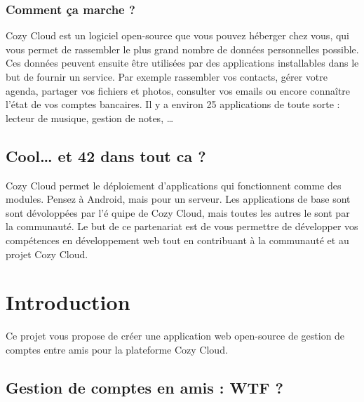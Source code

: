 \documentclass{42-fr}
\begin{document}
		\subsection{Comment ça marche ?}

			Cozy Cloud est un logiciel open-source que vous pouvez h\'eberger chez vous,
			qui vous permet de rassembler le plus grand nombre de donn\'ees
			personnelles possible. Ces donn\'ees peuvent ensuite \^etre utilis\'ees par des
			applications installables dans le but de fournir un service. Par exemple
			rassembler vos contacts, g\'erer votre agenda, partager vos fichiers et
			photos, consulter vos emails ou encore conna\^itre l'état de vos comptes
			bancaires. Il y a environ 25 applications de toute sorte : lecteur de musique,
			gestion de notes, …

	\section{Cool… et 42 dans tout ca ?}

		Cozy Cloud permet le déploiement d'applications qui fonctionnent comme
		des modules. Pensez à Android, mais pour un serveur. Les applications de
		base sont sont d\'evolopp\'ees par l'\'e quipe de Cozy Cloud, mais toutes
		les autres le sont par la communaut\'e. Le but de ce partenariat est de vous
		permettre de d\'evelopper vos comp\'etences en d\'eveloppement web tout
		en contribuant \`a la communaut\'e et au projet Cozy Cloud.


\chapter{Introduction}

	Ce projet vous propose de cr\'eer une application web open-source de gestion de
	comptes entre amis pour la plateforme Cozy Cloud.

	\section{Gestion de comptes en amis : WTF ?}
\end{document}
